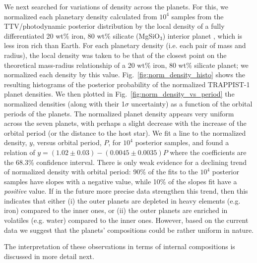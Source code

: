 \documentclass[twocolumn]{aastex63}
\begin{document}
We next searched for variations of density across the planets. For this, we normalized each planetary density calculated from $10^4$ samples from the TTV/photodynamic posterior distribution by the local density of a fully differentiated 20 wt\% iron, 80 wt\% silicate (MgSiO$_3$) interior planet \citep{Zeng2016}, which is less iron rich than Earth.  For each planetary density (i.e. each pair of mass and radius), the local density was taken to be that of the closest point on the theoretical mass-radius relationship of a 20 wt\% iron, 80 wt\% silicate planet;  we normalized each density by this value. Fig.~\ref{fig:norm_density_histo} shows the resulting histograms of the posterior probability of the normalized TRAPPIST-1 planet densities. We then plotted in Fig.~\ref{fig:norm_density_vs_period} the normalized densities (along with their 1$\sigma$ uncertainty) as a function of the orbital periods of the planets.  The normalized planet density appears very uniform across the seven planets, with perhaps a slight decrease with the increase of the orbital period (or the distance to the host star).  We fit a line to the normalized density, $y$, versus orbital period, $P$, for $10^4$ posterior samples, and found a relation of $y=(1.02\pm 0.03) - (0.0045\pm 0.0035)P$ where the
coefficients are the 68.3\% confidence interval. There is only weak evidence for a declining trend of normalized density with orbital period: 90\% of the fits to the $10^4$ posterior samples have slopes with a negative value, while 10\% of the slopes fit have a \emph{positive} value.  If in the future more precise data strengthen this trend, then
this indicates that either (i) the outer planets are depleted in heavy elements (e.g. iron) compared to the inner ones, or (ii) the outer planets are enriched in volatiles (e.g. water) compared to the inner ones.  However, based on the current data we suggest that the planets' compositions could be rather uniform in nature.

The interpretation of these observations in terms of internal compositions is discussed in more detail next.
\end{document}
